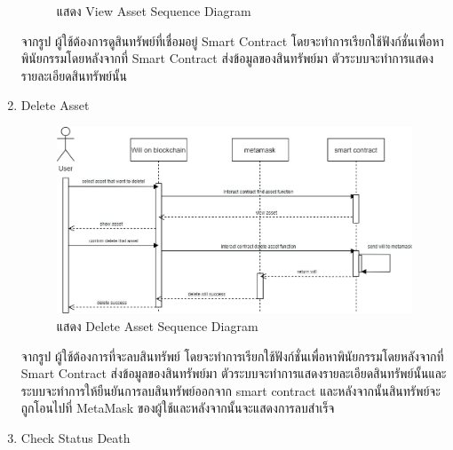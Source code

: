 \documentclass[12pt,oneside,openright,a4paper]{cpe-thai-project}
\begin{document}
\begin{enumerate}[label=\thesubsection.\arabic*,leftmargin=0pt,itemindent=2.5cm]
\begin{figure}[!thb]
			\caption{แสดง View Asset Sequence Diagram}
		\end{figure}
		\FloatBarrier
	\tab จากรูป ผู้ใช้ต้องการดูสินทรัพย์ที่เชื่อมอยู่ Smart Contract โดยจะทำการเรียกใช้ฟังก์ชั่นเพื่อหาพินัยกรรมโดยหลังจากที่ Smart Contract ส่งข้อมูลของสินทรัพย์มา ตัวระบบจะทำการแสดงรายละเอียดสินทรัพย์นั้น
	\item Delete Asset
	\begin{table}
\centering
\caption{ตารางแสดงรายละเอียดของ Use Case Connect meta mask Wallet}
\end{table}
		\begin{figure}[!thb]
			\centering
			\includegraphics[scale=0.2]{deleteAssetseq}
			\caption{แสดง Delete Asset Sequence Diagram}
		\end{figure}
		\FloatBarrier
	\tab จากรูป ผู้ใช้ต้องการที่จะลบสินทรัพย์ โดยจะทำการเรียกใช้ฟังก์ชั่นเพื่อหาพินัยกรรมโดยหลังจากที่ Smart Contract ส่งข้อมูลของสินทรัพย์มา ตัวระบบจะทำการแสดงรายละเอียดสินทรัพย์นั้นและระบบจะทำการให้ยืนยันการลบสินทรัพย์ออกจาก smart contract และหลังจากนั้นสินทรัพย์จะถูกโอนไปที่ MetaMask ของผู้ใช้และหลังจากนั้นจะแสดงการลบสำเร็จ
	\item Check Status Death
\begin{table}
\centering
\caption{ตารางแสดงรายละเอียดของ Use Case Connect meta mask Wallet}
\end{table}
\end{enumerate}
\end{document}

